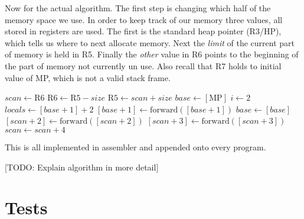 \documentclass{scrartcl}
\begin{document}
Now for the actual algorithm. The first step is changing which half
of the memory space we use. In order to keep track of our memory three
values, all stored in registers are used. The first is the standard
heap pointer (R3/HP), which tells us where to next allocate memory.
Next the \emph{limit} of the current part of memory is held in R5.
Finally the \emph{other} value in R6 points to the beginning of the
part of memory not currently un use. Also recall that R7 holds to initial
value of MP, which is not a valid stack frame.

\begin{algorithmic}
\State $scan \gets \mathrm{R6}$ 
\State $\mathrm{R6} \gets \mathrm{R5} - size$ 
\State $\mathrm{R5} \gets scan + size$
\State {}
\State $base \gets [\mathrm{MP}]$
 
    \State $i \gets 2$
    \State $locals \gets [base + 1] + 2$
        \State $[base + 1] \gets \mathrm{forward}([base + 1])$
    \EndWhile
    \State $base \gets [base]$
\EndWhile
{} 
    \State $[scan + 2] \gets \mathrm{forward}([scan + 2])$
    \State $[scan + 3] \gets \mathrm{forward}([scan + 3])$
    \State $scan \gets scan + 4$
\EndWhile
\end{algorithmic}

This is all implemented in assembler and appended onto every program.

[TODO: Explain algorithm in more detail]

\section{Tests}

\printbibliography
\end{document}
